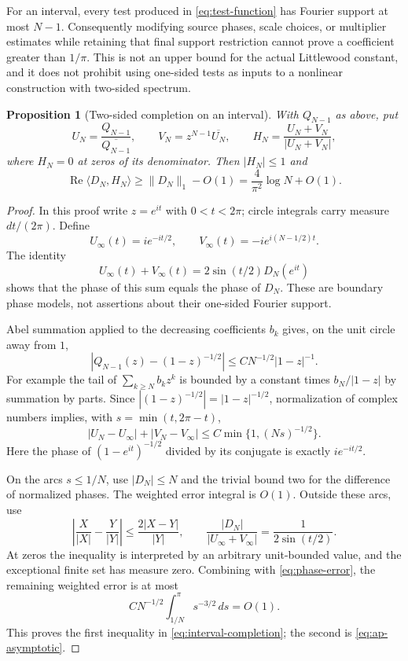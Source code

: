 \documentclass[11pt,reqno]{amsart}
\numberwithin{equation}{section}
\newtheorem{proposition}[theorem]{Proposition}
\theoremstyle{definition}
\theoremstyle{remark}
\newcommand{\norm}[1]{\lVert#1\rVert}
\newcommand{\ip}[2]{\langle#1,#2\rangle}
\DeclareMathOperator{\Rea}{Re}
\begin{document}
For an interval, every test produced in \eqref{eq:test-function} has
Fourier support at most $N-1$. Consequently modifying source phases,
scale choices, or multiplier estimates while retaining that final
support restriction cannot prove a coefficient greater than $1/\pi$.
This is not an upper bound for the actual Littlewood constant, and it
does not prohibit using one-sided tests as inputs to a nonlinear
construction with two-sided spectrum.

\begin{proposition}[Two-sided completion on an interval]
\label{prop:interval-completion}
With $Q_{N-1}$ as above, put
\[
 U_N=\frac{Q_{N-1}}{\overline{Q_{N-1}}},\qquad
 V_N=z^{N-1}\overline{U_N},\qquad
 H_N=\frac{U_N+V_N}{|U_N+V_N|},
\]
where $H_N=0$ at zeros of its denominator. Then $|H_N|\le1$ and
\begin{equation}\label{eq:interval-completion}
 \Rea\ip{D_N}{H_N}\ge\norm{D_N}_1-O(1)
 =\frac4{\pi^2}\log N+O(1).
\end{equation}
\end{proposition}
\begin{proof}
In this proof write $z=e^{it}$ with $0<t<2\pi$; circle integrals carry
measure $dt/(2\pi)$. Define
\[
 U_\infty(t)=ie^{-it/2},\qquad
 V_\infty(t)=-ie^{i(N-1/2)t}.
\]
The identity
\begin{equation}\label{eq:interval-phase-identity}
 U_\infty(t)+V_\infty(t)=2\sin(t/2)D_N(e^{it})
\end{equation}
shows that the phase of this sum equals the phase of $D_N$. These are
boundary phase models, not assertions about their one-sided Fourier
support.

Abel summation applied to the decreasing coefficients $b_k$ gives,
on the unit circle away from $1$,
\[
 |Q_{N-1}(z)-(1-z)^{-1/2}|
 \le C N^{-1/2}|1-z|^{-1}.
\]
For example the tail of $\sum_{k\ge N}b_kz^k$ is bounded by a
constant times $b_N/|1-z|$ by summation by parts. Since
$|(1-z)^{-1/2}|=|1-z|^{-1/2}$, normalization of complex numbers implies,
with $s=\min(t,2\pi-t)$,
\begin{equation}\label{eq:phase-error}
 |U_N-U_\infty|+|V_N-V_\infty|
 \le C\min\{1,(Ns)^{-1/2}\}.
\end{equation}
Here the phase of $(1-e^{it})^{-1/2}$ divided by its conjugate is
exactly $ie^{-it/2}$.

On the arcs $s\le1/N$, use $|D_N|\le N$ and the trivial bound two
for the difference of normalized phases. The weighted error integral
is $O(1)$. Outside these arcs, use
\[
 \left|\frac X{|X|}-\frac Y{|Y|}\right|
 \le\frac{2|X-Y|}{|Y|},\qquad
 \frac{|D_N|}{|U_\infty+V_\infty|}
 =\frac1{2\sin(t/2)}.
\]
At zeros the inequality is interpreted by an arbitrary unit-bounded
value, and the exceptional finite set has measure zero. Combining
with \eqref{eq:phase-error}, the remaining weighted error is at most
\[
 C N^{-1/2}\int_{1/N}^\pi s^{-3/2}\,ds=O(1).
\]
This proves the first inequality in \eqref{eq:interval-completion};
the second is \eqref{eq:ap-asymptotic}.
\end{proof}
\end{document}
